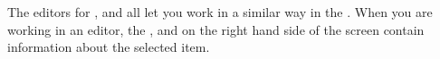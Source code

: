 The editors for \gdcases{}, \gdsuites{} and \gdjobs{} all let you work in a similar way in the \ite{}. When you are working in an editor, the \gdpropview{}, \gddatasetsview{} and \gdcompnamesview{} on the right hand side of the screen contain information about the selected item. 
